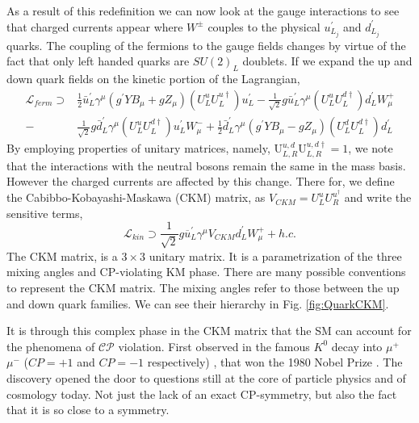 As a result of this redefinition we can now look at the gauge interactions to see that charged currents appear where $W^\pm$ couples to the physical $u^\prime_{L_j}$ and $d^\prime_{L_j}$ quarks. 
%
The coupling of the fermions to the gauge fields changes by virtue of the fact that only left handed quarks are $SU(2)_L$ doublets. If we expand the up and down quark fields on the kinetic portion of the Lagrangian,
%
\begin{equation}
\label{LagFermFCCCs}
\begin{split}
\mathcal{L}_{ferm} \supset & 
\frac{1}{2} \bar{u}^\prime_L \gamma^\mu \left( g^\prime Y B_\mu + g Z_\mu  \right) \left(U^u_L U^{u \dagger}_L \right) u^\prime_L - \frac{1}{\sqrt{2}} g \bar{u}^\prime_L \gamma^\mu \left( U^u_L U^{d \dagger}_L \right) d^\prime_L W^+_\mu \\ \nonumber   
- 
& \frac{1}{\sqrt{2}} g \bar{d}^\prime_L \gamma^\mu \left( U^u_L U^{d \dagger}_L \right) u^\prime_L W^-_\mu 
+ 
\frac{1}{2} \bar{d}^\prime_L \gamma^\mu \left( g^\prime Y B_\mu - g Z_\mu \right) \left( U^d_L U^{d \dagger}_L \right) d^\prime_L  
\end{split}
\end{equation}
%
By employing properties of unitary matrices, namely, $ \mathrm{U}^{u,d}_{L,R} \mathrm{U}^{u,d \dagger}_{L,R} = 1$, we note that the interactions with the neutral bosons remain the same in the mass basis.
%
However the charged currents are affected by this change.
%
There for, we define the Cabibbo-Kobayashi-Maskawa (CKM) matrix, as $V_{CKM} = U^u_L U^{u ^\dagger }_R $ and write the sensitive terms,
%
\begin{equation}
\mathcal{L}_{kin} \supset \frac{1}{\sqrt{2}} g \overline{u}^\prime_L \gamma^\mu V_{CKM} d_L^\prime W^+_\mu + h.c. 
\end{equation}
%
The CKM matrix, is a $3 \times 3$ unitary matrix. It is a parametrization of the three mixing angles and CP-violating KM phase. There are many possible conventions to represent the CKM matrix.
%
The mixing angles refer to those between the up and down quark families. We can see their hierarchy in Fig. \ref{fig:QuarkCKM}.

It is through this complex phase in the CKM matrix that the SM can account for the phenomena of $\mathcal{CP}$ violation. First observed in the famous $K^0$ decay into $\mu^+$ $\mu^-$ ($CP=+1$ and $CP=-1$ respectively) \cite{PhysRevLett.13.138}, that won the 1980 Nobel Prize \cite{NobelPrize:1980-Physics}. The discovery opened the door to questions still at the core of particle physics and of cosmology today. Not just the lack of an exact CP-symmetry, but also the fact that it is so close to a symmetry.

